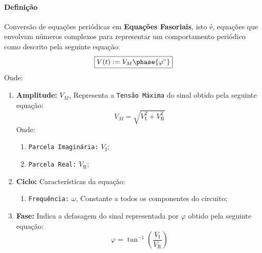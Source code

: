 \documentclass{article}
\begin{document}
            \paragraph{Definição}Conversão de equações periódicas em \textbf{Equações Fasoriais}, isto é, equações que envolvam números complexos para representar um comportamento periódico como descrito pela seguinte equação:
                \begin{equation}
                    \boxed{
                        V(t) := V_{M}\phase{\varphi^{\circ}}
                    }
                \end{equation}
            Onde:
                \begin{enumerate}
                    \item \textbf{Amplitude:} $V_{M}$, Representa a \texttt{Tensão Máxima} do sinal obtido pela seguinte equação:
                        \begin{equation*}
                            \boxed{
                                V_{M} = \sqrt{
                                    V_{\text{I}}^{2} + V_{\text{R}}^{2}
                                }
                            }
                        \end{equation*}
                    Onde:
                        \begin{enumerate}[noitemsep, rightmargin = \leftmargin]
                            \item \texttt{Parcela Imaginária:} $V_{\text{I}}$;

                            \item \texttt{Parcela Real:} $V_{\text{R}}$;
                        \end{enumerate}


                    \item \textbf{Ciclo:} Características da equação:
                        \begin{enumerate}[noitemsep, rightmargin = \leftmargin]
                            \item \texttt{Frequência:} $\omega$, Constante a todos os componentes do circuito;
                        \end{enumerate}

                    \item \textbf{Fase:} Indica a defasagem do sinal representada por $\varphi$ obtido pela seguinte equação:
                        \begin{equation*}
                            \boxed{
                                \varphi = \tan^{-1}
                                \left(
                                    \frac{V_{\text{I}}}{V_{\text{R}}}
                                \right)
                            }
                        \end{equation*}
                \end{enumerate}
\end{document}
